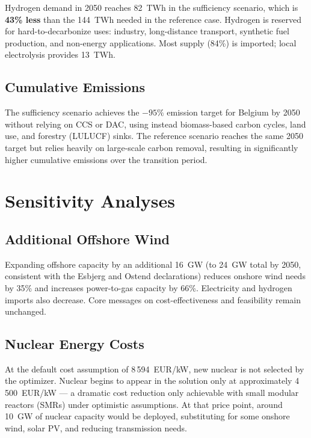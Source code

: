 Hydrogen demand in 2050 reaches 82~TWh in the sufficiency scenario, which is
\textbf{43\% less} than the 144~TWh needed in the reference case. Hydrogen is
reserved for hard-to-decarbonize uses: industry, long-distance transport,
synthetic fuel production, and non-energy applications. Most supply (84\%) is
imported; local electrolysis provides 13~TWh.

\subsection{Cumulative Emissions}

The sufficiency scenario achieves the $-95\%$ emission target for Belgium by 2050
without relying on CCS or DAC, using instead biomass-based carbon cycles, land use,
and forestry (LULUCF) sinks. The reference scenario reaches the same 2050 target
but relies heavily on large-scale carbon removal, resulting in significantly higher
cumulative emissions over the transition period.

\section{Sensitivity Analyses}

\subsection{Additional Offshore Wind}

Expanding offshore capacity by an additional 16~GW (to 24~GW total by 2050,
consistent with the Esbjerg and Ostend declarations) reduces onshore wind needs
by 35\% and increases power-to-gas capacity by 66\%. Electricity and hydrogen
imports also decrease. Core messages on cost-effectiveness and feasibility remain
unchanged.

\subsection{Nuclear Energy Costs}

At the default cost assumption of 8\,594~EUR/kW, new nuclear is not selected by
the optimizer. Nuclear begins to appear in the solution only at approximately
4\,500~EUR/kW --- a dramatic cost reduction only achievable with small modular
reactors (SMRs) under optimistic assumptions. At that price point, around 10~GW
of nuclear capacity would be deployed, substituting for some onshore wind,
solar PV, and reducing transmission needs.

